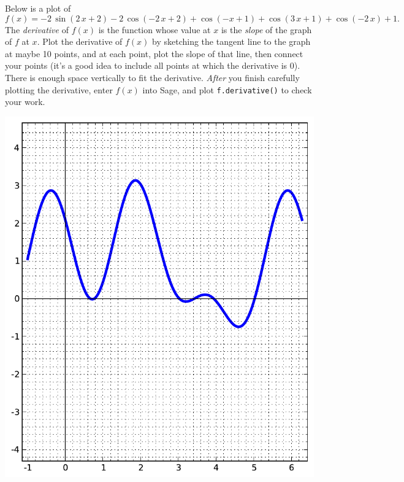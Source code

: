 Below is a plot of $$f(x)=-2 \, \sin\left(2 \, x + 2\right) - 2 \, \cos\left(-2 \, x + 2\right) + \cos\left(-x + 1\right) + \cos\left(3 \, x + 1\right) + \cos\left(-2 \, x\right) + 1.$$  The {\em \color{red}derivative} of $f(x)$ is the function whose value at $x$ is the {\em slope} of the graph of $f$ at $x$.  Plot the derivative of $f(x)$ by sketching the tangent line to the graph at maybe 10 points, and at each point, plot the slope of that line, then connect your points (it's a good idea to include all points at which the derivative is 0).  There is enough space vertically to fit the derivative.  {\em After} you finish carefully plotting the derivative, enter $f(x)$ into Sage, and plot {\color{blue}\verb|f.derivative()|} to check your work.
\begin{center}\includegraphics{functions/37.pdf}\end{center}\newpage

